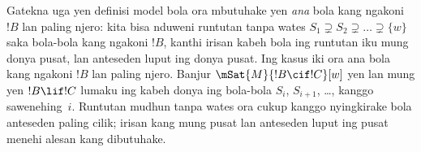 \documentclass[../../../include/open-logic-section]{subfiles}
\begin{document}
Gatekna uga yen definisi model bola ora mbutuhake yen
\emph{ana} bola kang ngakoni $!B$ lan paling njero: kita bisa
nduweni runtutan tanpa wates $S_1 \supsetneq S_2 \supsetneq
\dots \supsetneq \{w\}$ saka bola-bola kang ngakoni $!B$,
kanthi irisan kabeh bola ing runtutan iku mung donya pusat,
lan anteseden luput ing donya pusat. Ing kasus iki ora ana
bola kang ngakoni $!B$ lan paling njero. Banjur
$\mSat{M}{!B \cif !C}[w]$ yen lan mung yen $!B \lif !C$
lumaku ing kabeh donya ing bola-bola $S_i$, $S_{i+1}$,
\dots, kanggo sawenehing~$i$.
Runtutan mudhun tanpa wates ora cukup kanggo nyingkirake bola anteseden paling cilik; irisan kang mung pusat lan anteseden luput ing pusat menehi alesan kang dibutuhake.
\end{document}
